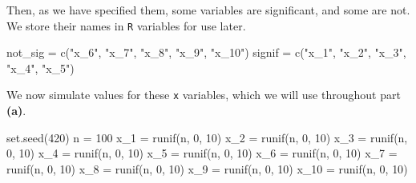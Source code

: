\documentclass[
]{article}
\newenvironment{Shaded}{\begin{snugshade}}{\end{snugshade}}
\newcommand{\DecValTok}[1]{\textcolor[rgb]{0.00,0.00,0.81}{#1}}
\newcommand{\FunctionTok}[1]{\textcolor[rgb]{0.00,0.00,0.00}{#1}}
\newcommand{\NormalTok}[1]{#1}
\newcommand{\OtherTok}[1]{\textcolor[rgb]{0.56,0.35,0.01}{#1}}
\newcommand{\StringTok}[1]{\textcolor[rgb]{0.31,0.60,0.02}{#1}}
\begin{document}
Then, as we have specified them, some variables are significant, and
some are not. We store their names in \texttt{R} variables for use
later.

\begin{Shaded}
\begin{Highlighting}[]
\NormalTok{not\_sig  }\OtherTok{=} \FunctionTok{c}\NormalTok{(}\StringTok{"x\_6"}\NormalTok{, }\StringTok{"x\_7"}\NormalTok{, }\StringTok{"x\_8"}\NormalTok{, }\StringTok{"x\_9"}\NormalTok{, }\StringTok{"x\_10"}\NormalTok{)}
\NormalTok{signif }\OtherTok{=} \FunctionTok{c}\NormalTok{(}\StringTok{"x\_1"}\NormalTok{, }\StringTok{"x\_2"}\NormalTok{, }\StringTok{"x\_3"}\NormalTok{, }\StringTok{"x\_4"}\NormalTok{, }\StringTok{"x\_5"}\NormalTok{)}
\end{Highlighting}
\end{Shaded}

We now simulate values for these \texttt{x} variables, which we will use
throughout part \textbf{(a)}.

\begin{Shaded}
\begin{Highlighting}[]
\FunctionTok{set.seed}\NormalTok{(}\DecValTok{420}\NormalTok{)}
\NormalTok{n }\OtherTok{=} \DecValTok{100}
\NormalTok{x\_1  }\OtherTok{=} \FunctionTok{runif}\NormalTok{(n, }\DecValTok{0}\NormalTok{, }\DecValTok{10}\NormalTok{)}
\NormalTok{x\_2  }\OtherTok{=} \FunctionTok{runif}\NormalTok{(n, }\DecValTok{0}\NormalTok{, }\DecValTok{10}\NormalTok{)}
\NormalTok{x\_3  }\OtherTok{=} \FunctionTok{runif}\NormalTok{(n, }\DecValTok{0}\NormalTok{, }\DecValTok{10}\NormalTok{)}
\NormalTok{x\_4  }\OtherTok{=} \FunctionTok{runif}\NormalTok{(n, }\DecValTok{0}\NormalTok{, }\DecValTok{10}\NormalTok{)}
\NormalTok{x\_5  }\OtherTok{=} \FunctionTok{runif}\NormalTok{(n, }\DecValTok{0}\NormalTok{, }\DecValTok{10}\NormalTok{)}
\NormalTok{x\_6  }\OtherTok{=} \FunctionTok{runif}\NormalTok{(n, }\DecValTok{0}\NormalTok{, }\DecValTok{10}\NormalTok{)}
\NormalTok{x\_7  }\OtherTok{=} \FunctionTok{runif}\NormalTok{(n, }\DecValTok{0}\NormalTok{, }\DecValTok{10}\NormalTok{)}
\NormalTok{x\_8  }\OtherTok{=} \FunctionTok{runif}\NormalTok{(n, }\DecValTok{0}\NormalTok{, }\DecValTok{10}\NormalTok{)}
\NormalTok{x\_9  }\OtherTok{=} \FunctionTok{runif}\NormalTok{(n, }\DecValTok{0}\NormalTok{, }\DecValTok{10}\NormalTok{)}
\NormalTok{x\_10 }\OtherTok{=} \FunctionTok{runif}\NormalTok{(n, }\DecValTok{0}\NormalTok{, }\DecValTok{10}\NormalTok{)}
\end{Highlighting}
\end{Shaded}
\end{document}
